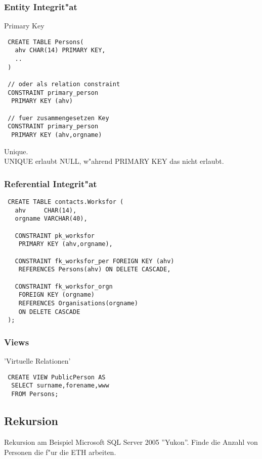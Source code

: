 \documentclass[german, 10pt, a4paper, twocolumn]{scrartcl}
\theoremstyle{definition}
\theoremstyle{remark}
\theoremstyle{example}
\begin{document}
\subsubsection{Entity Integrit"at}

Primary Key
\begin{verbatim}
 CREATE TABLE Persons(
   ahv CHAR(14) PRIMARY KEY,
   ..
 )
 
 // oder als relation constraint
 CONSTRAINT primary_person
  PRIMARY KEY (ahv)
 
 // fuer zusammengesetzen Key
 CONSTRAINT primary_person
  PRIMARY KEY (ahv,orgname)
\end{verbatim}

Unique.\\
UNIQUE erlaubt NULL, w"ahrend PRIMARY KEY das nicht erlaubt.


\subsubsection{Referential Integrit"at}

\begin{verbatim}
 CREATE TABLE contacts.Worksfor (
   ahv     CHAR(14),
   orgname VARCHAR(40),
   
   CONSTRAINT pk_worksfor
    PRIMARY KEY (ahv,orgname),
   
   CONSTRAINT fk_worksfor_per FOREIGN KEY (ahv)
    REFERENCES Persons(ahv) ON DELETE CASCADE,
   
   CONSTRAINT fk_worksfor_orgn
    FOREIGN KEY (orgname)
    REFERENCES Organisations(orgname)
    ON DELETE CASCADE
 );
\end{verbatim}


\subsubsection{Views}

'Virtuelle Relationen'

\begin{verbatim}
 CREATE VIEW PublicPerson AS
  SELECT surname,forename,www
  FROM Persons;
\end{verbatim}


\subsection{Rekursion}

Rekursion am Beispiel Microsoft SQL Server 2005 ''Yukon''. Finde die Anzahl von Personen die f"ur die ETH arbeiten.
\end{document}

